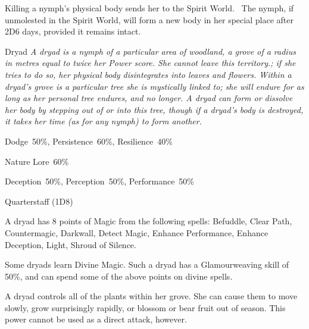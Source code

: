 Killing a nymph’s physical body sends her to the Spirit World.  The nymph, if unmolested in the Spirit World, will form a new body in her special place after 2D6 days, provided it remains intact.


\begin{monsterbox}{Dryad}
	\textit{A dryad is a nymph of a particular area of woodland, a grove of a radius in metres equal to twice her Power score. She cannot leave this territory.; if she tries to do so, her physical body disintegrates into leaves and flowers. Within a dryad’s grove is a particular tree she is mystically linked to; she will endure for as long as her personal tree endures, and no longer. A dryad can form or dissolve her body by stepping out of or into this tree, though if a dryad’s body is destroyed, it takes her time (as for any nymph) to form another.}\\
	\rpghline
	\basics[%
        hitpoints  = 11, 
	majorwound = 6,
	damagemodifier = 0,
	powerpoints = 22,
	movementrate = 15m,
	armor = None,
	plunderrating = 1
	]
	\rpghline%
	\stats[ %
		STR = 2D6    (7),
		CON = 3D6    (11),
		DEX = 4D6    (14),
		SIZ = 2D6+3  (10),
		INT = 3D6+6  (17),
		POW = 2D6+15 (22),
		CHA = 2D6+12 (19)
	]
	\rpghline%
	\begin{rpg-monsteraction}[Resistances]
		Dodge~50\%, Persistence~60\%, Resilience~40\%
	\end{rpg-monsteraction}
	\begin{rpg-monsteraction}[Knowledge]
		Nature Lore~60\%
	\end{rpg-monsteraction}
	\begin{rpg-monsteraction}[Practical]
		Deception~50\%, Perception~50\%, Performance~50\%
	\end{rpg-monsteraction}
	\begin{rpg-monsteraction}
		Quarterstaff (1D8)
	\end{rpg-monsteraction}
	\begin{rpg-monsteraction}[Magic 60\%]
		A dryad has 8 points of Magic from the following spells: Befuddle, Clear Path, Countermagic, Darkwall, Detect Magic, Enhance Performance, Enhance Deception, Light, Shroud of Silence.
	\end{rpg-monsteraction}
	\begin{rpg-monsteraction}
		Some dryads learn Divine Magic. Such a dryad has a Glamourweaving skill of 50\%, and can spend some of the above points on divine spells. 
	\end{rpg-monsteraction}
	\begin{rpg-monsteraction}
		A dryad controls all of the plants within her grove. She can cause them to move slowly, grow surprisingly rapidly, or blossom or bear fruit out of season. This power cannot be used as a direct attack, however.
	\end{rpg-monsteraction}

\end{monsterbox}

